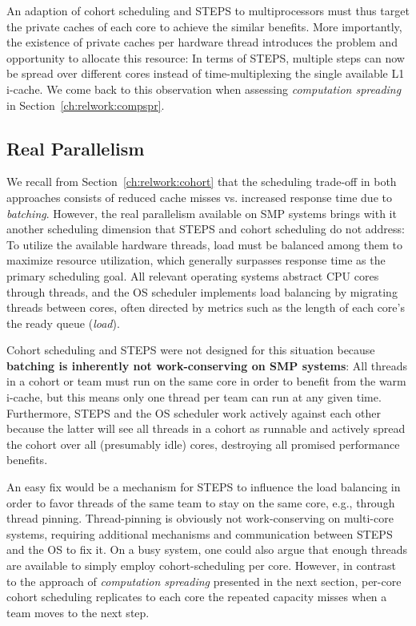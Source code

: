 \documentclass[12pt,a4paper]{book}
\begin{document}
An adaption of cohort scheduling and STEPS to multiprocessors must thus target the private caches of each core to achieve the similar benefits.
More importantly, the existence of private caches per hardware thread introduces the problem and opportunity to allocate this resource:
In terms of STEPS, multiple steps can now be spread over different cores instead of time-multiplexing the single available L1 i-cache.
We come back to this observation when assessing \emph{computation spreading} in Section~\ref{ch:relwork:compspr}.

\subsection{Real Parallelism}
We recall from Section~\ref{ch:relwork:cohort} that the scheduling trade-off in both approaches consists of reduced cache misses vs. increased response time due to \emph{batching}.
However, the real parallelism available on SMP systems brings with it another scheduling dimension that STEPS and cohort scheduling do not address:
To utilize the available hardware threads, load must be balanced among them to maximize resource utilization, which generally surpasses response time as the primary scheduling goal.
All relevant operating systems abstract CPU cores through threads, and the OS scheduler implements load balancing by migrating threads between cores, often directed by metrics such as the length of each core's the ready queue (\emph{load}).~\cite{freeBSDSchedulerLoad}

Cohort scheduling and STEPS were not designed for this situation because
\textbf{batching is inherently not work-conserving on SMP systems}:
All threads in a cohort or team must run on the same core in order to benefit from the warm i-cache, but this means only one thread per team can run at any given time.
Furthermore, STEPS and the OS scheduler work actively against each other because the latter will see all threads in a cohort as runnable and actively spread the cohort over all (presumably idle) cores,
destroying all promised performance benefits.

An easy fix would be a mechanism for STEPS to influence the load balancing in order to favor threads of the same team to stay on the same core, e.g., through thread pinning.
Thread-pinning is obviously not work-conserving on multi-core systems, requiring additional mechanisms and communication between STEPS and the OS to fix it.
On a busy system, one could also argue that enough threads are available to simply employ cohort-scheduling per core.
However, in contrast to the approach of \emph{computation spreading} presented in the next section, per-core cohort scheduling replicates to each core the repeated capacity misses when a team moves to the next step.
\end{document}
